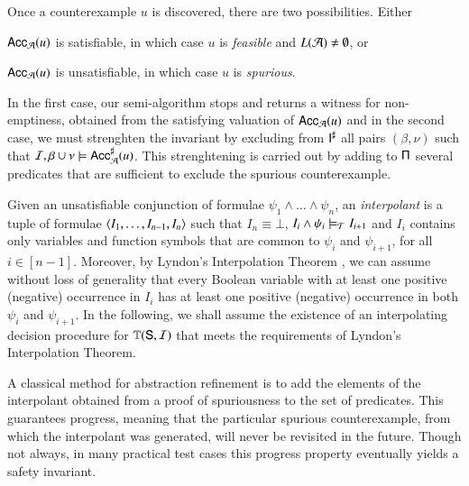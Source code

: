 \documentclass[10pt]{llncs}
\begin{document}
Once a counterexample $u$ is discovered, there are two
possibilities. Either\begin{inparaenum}[(i)]
\item $\mathsf{Acc}_{\mathcal{A}}(u)$ is satisfiable, in which case $u$ is
  \emph{feasible} and $L(\mathcal{A}) \neq \emptyset$, or
%
\item $\mathsf{Acc}_{\mathcal{A}}(u)$ is unsatisfiable, in which case $u$ is
  \emph{spurious}.
\end{inparaenum}
In the first case, our semi-algorithm stops and returns a witness for
non-emptiness, obtained from the satisfying valuation of
$\mathsf{Acc}_{\mathcal{A}}(u)$ and in the second case, we must strenghten the
invariant by excluding from ${\mathsf{I}}^\sharp$ all pairs $(\beta,\nu)$ such
that $\mathcal{I},\beta\cup\nu \models {\mathsf{Acc}}^\sharp_{\mathcal{A}}(u)$. This strenghtening
is carried out by adding to $\mathsf{\Pi}$ several predicates that are
sufficient to exclude the spurious counterexample.

Given an unsatisfiable conjunction of formulae $\psi_1 \wedge \ldots
\wedge \psi_n$, an \emph{interpolant} is a tuple of formulae
$\left\langle I_1,\ldots,I_{n-1},I_n \right\rangle$ such that $I_n \equiv \bot$, $I_i
\wedge \psi_i \models_{\mathcal{T}} I_{i+1}$ and $I_i$ contains only variables
and function symbols that are common to $\psi_i$ and $\psi_{i+1}$, for
all $i \in [n-1]$. Moreover, by Lyndon's Interpolation Theorem
\cite{Lyndon59}, we can assume without loss of generality that every
Boolean variable with at least one positive (negative) occurrence in
$I_i$ has at least one positive (negative) occurrence in both $\psi_i$
and $\psi_{i+1}$. In the following, we shall assume the existence of
an interpolating decision procedure for $\mathbb{T}(\mathsf{S},\mathcal{I})$ that meets
the requirements of Lyndon's Interpolation Theorem.


A classical method for abstraction refinement is to add the elements
of the interpolant obtained from a proof of spuriousness to the set of
predicates. This guarantees progress, meaning that the particular
spurious counterexample, from which the interpolant was generated,
will never be revisited in the future. Though not always, in many
practical test cases this progress property eventually yields a safety
invariant.
\end{document}
